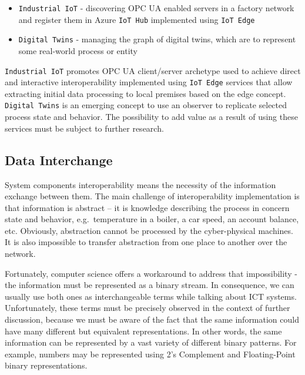 \documentclass{jacsart}
\providecommand{\tightlist} { \setlength{\itemsep}{0pt}\setlength{\parskip}{0pt}}
\begin{document}
\begin{itemize}
\tightlist
\item
  \texttt{Industrial\ IoT} - discovering OPC UA enabled servers in a factory network and register them in Azure \texttt{IoT\ Hub} implemented using \texttt{IoT\ Edge}
\item
  \texttt{Digital\ Twins} - managing the graph of digital twins, which are to represent some real-world process or entity
\end{itemize}

\texttt{Industrial\ IoT} promotes OPC UA client/server archetype used to
achieve direct and interactive interoperability implemented using
\texttt{IoT\ Edge} services that allow extracting initial data
processing to local premises based on the edge concept.
\texttt{Digital\ Twins} is an emerging concept to use an observer to
replicate selected process state and behavior. The possibility to add
value as a result of using these services must be subject to further
research.

\hypertarget{data-interchange}{%
\subsection{Data Interchange}\label{data-interchange}}

System components interoperability means the necessity of the
information exchange between them. The main challenge of
interoperability implementation is that information is abstract -- it is
knowledge describing the process in concern state and behavior,
e.g.~temperature in a boiler, a car speed, an account balance, etc.
Obviously, abstraction cannot be processed by the cyber-physical
machines. It is also impossible to transfer abstraction from one place
to another over the network.

Fortunately, computer science offers a workaround to address that
impossibility - the information must be represented as a binary stream.
In consequence, we can usually use both ones as interchangeable terms
while talking about ICT systems. Unfortunately, these terms must be
precisely observed in the context of further discussion, because we must
be aware of the fact that the same information could have many different
but equivalent representations. In other words, the same information can
be represented by a vast variety of different binary patterns. For
example, numbers may be represented using 2's Complement and
Floating-Point binary representations.
\end{document}
